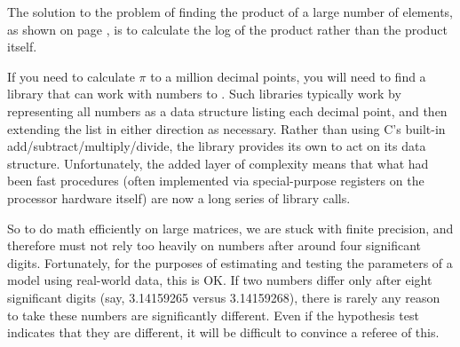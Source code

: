\begin{center}
\vspace{\baselineskip}
\hspace{-1.4cm} 
\vspace{\baselineskip}
\end{center}

The solution to the problem of finding the product of a large number of
elements, as shown on page \pageref{precisionfix}, is to calculate
the log of the product rather than the product itself.

If you need to calculate $\pi$ to a million decimal points, you
will need to find a library that can work with numbers to . Such libraries typically work by representing all numbers
as a data structure listing each decimal point, and then extending the
list in either direction as necessary. Rather than using C's built-in
add/subtract/multiply/divide, the library provides its own to act on
its data structure. Unfortunately, the added layer of complexity means
that what had been fast procedures (often implemented via
special-purpose registers on the processor hardware itself) are now a
long series of library calls.

So to do math efficiently on large matrices, we are stuck with finite
precision, and therefore must not
rely too heavily on numbers after around four significant digits. 
Fortunately, for the purposes of estimating and testing
the parameters of a model using real-world data, this is OK. If two
numbers differ only after eight significant digits (say, 3.14159265
versus 3.14159268), there is rarely any reason to take these numbers are
significantly different. Even if the hypothesis test indicates that they
are different, it will be difficult to convince a referee of this.


